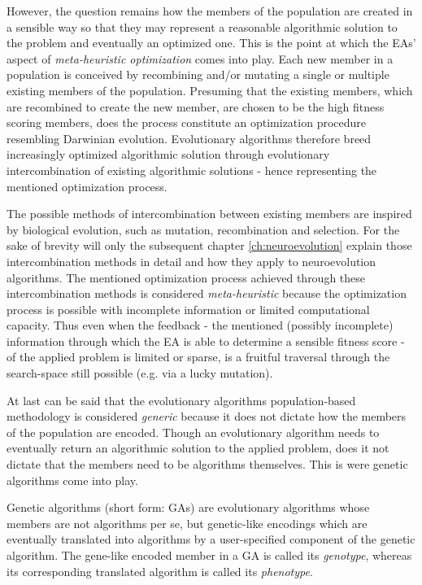 \documentclass[journal, a4paper]{IEEEtran}
\begin{document}
However, the question remains how the members of the population are created in a sensible way so that they may represent a reasonable algorithmic solution to the problem and eventually an optimized one. This is the point at which the EAs' aspect of \textit{meta-heuristic optimization} comes into play. Each new member in a population is conceived by recombining and/or mutating a single or multiple existing members of the population. Presuming that the existing members, which are recombined to create the new member, are chosen to be the high fitness scoring members, does the process constitute an optimization procedure resembling Darwinian evolution. Evolutionary algorithms therefore breed increasingly optimized algorithmic solution through evolutionary intercombination of existing algorithmic solutions - hence representing the mentioned optimization process. 

The possible methods of intercombination between existing members are inspired by biological evolution, such as mutation, recombination and selection. For the sake of brevity will only the subsequent chapter \ref{ch:neuroevolution} explain those intercombination methods in detail and how they apply to neuroevolution algorithms. The mentioned optimization process achieved through these intercombination methods is considered \textit{meta-heuristic} because the optimization process is possible with incomplete information or limited computational capacity. Thus even when the feedback - the mentioned (possibly incomplete) information through which the EA is able to determine a sensible fitness score - of the applied problem is limited or sparse, is a fruitful traversal through the search-space still possible (e.g. via a lucky mutation).

At last can be said that the evolutionary algorithms population-based methodology is considered \textit{generic} because it does not dictate how the members of the population are encoded. Though an evolutionary algorithm needs to eventually return an algorithmic solution to the applied problem, does it not dictate that the members need to be algorithms themselves. This is were genetic algorithms come into play.

Genetic algorithms (short form: GAs) are evolutionary algorithms whose members are not algorithms per se, but genetic-like encodings which are eventually translated into algorithms by a user-specified component of the genetic algorithm. The gene-like encoded member in a GA is called its \textit{genotype}, whereas its corresponding translated algorithm is called its \textit{phenotype}.
\end{document}
